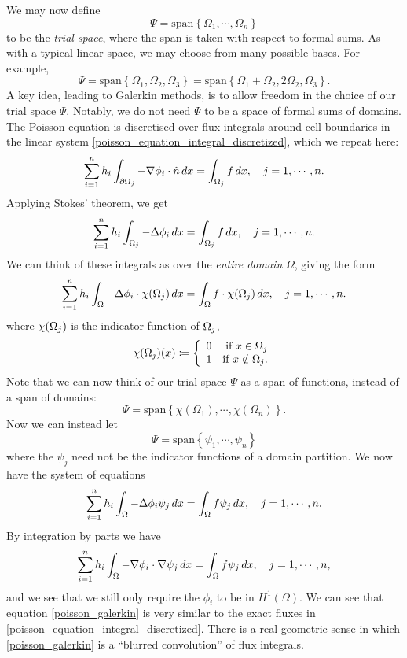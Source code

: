 We may now define
    $$\Psi = \text{span}\left\{\Omega_1,\cdots,\Omega_n\right\}$$
to be the \textit{trial space}, where the span is taken with respect to formal sums. As with a typical linear space,
we may choose from many possible bases. For example,
    $$\Psi = \text{span}\left\{\Omega_1, \Omega_2, \Omega_3\right\} =
    \text{span}\left\{\Omega_1 + \Omega_2, 2\Omega_2, \Omega_3\right\}.$$
A key idea, leading to Galerkin methods, is to allow freedom in the choice of our trial space $\Psi$.
Notably, we do not need $\Psi$ to be a space of formal sums of domains.
The Poisson equation is discretised over flux integrals around cell boundaries in the linear system \eqref{poisson_equation_integral_discretized},
which we repeat here:
\begin{align*}
    \sum_{i=1}^n h_i\int_{{\partial\Omega}_j} -\nabla \phi_i \cdot \hat{n}\,dx = \int_{{\Omega}_j} f\,dx,\quad j=1,\cdots,n.
\end{align*}
Applying Stokes' theorem, we get
\begin{align*}
    \sum_{i=1}^n h_i\int_{{\Omega}_j} -\Delta \phi_i \,dx = \int_{{\Omega}_j} f\,dx,\quad j=1,\cdots,n.
\end{align*}
We can think of these integrals as over the \textit{entire domain} $\Omega$, giving the form
\begin{align*}
    \sum_{i=1}^n h_i\int_{{\Omega}} -\Delta \phi_i\cdot \chi({\Omega}_j)\,dx = \int_{{\Omega}} f\cdot\chi({\Omega}_j)\,dx,\quad j=1,\cdots,n.
\end{align*}
where $\chi({\Omega}_j)$ is the indicator function of ${\Omega}_j$,
\begin{align*}
    \chi({\Omega}_j)(x) \coloneqq \left\{\begin{array}{lr}
        0 &\text{if $x \in {\Omega}_j$}\\
        1 &\text{if $x \notin {\Omega}_j$.}\\
        \end{array}\right.
\end{align*}
Note that we can now think of our trial space $\Psi$ as a span of functions, instead of a span of domains:
    $$\Psi = \text{span}\left\{\chi(\Omega_1),\cdots,\chi(\Omega_n)\right\}.$$
Now we can instead let
    $$\Psi = \text{span}\left\{\psi_1,\cdots,\psi_n\right\}$$
where the $\psi_j$
need not be the indicator functions of a domain partition. We now have the system of equations
\begin{align*}
    \sum_{i=1}^n h_i\int_{{\Omega}} -\Delta \phi_i \psi_j\,dx = \int_{{\Omega}} f\psi_j\,dx,\quad j=1,\cdots,n.
\end{align*}
By integration by parts we have
\begin{equation}\label{poisson_galerkin}
    \sum_{i=1}^n h_i\int_{{\Omega}} -\nabla \phi_i \cdot \nabla \psi_j\,dx = \int_{{\Omega}} f\psi_j\,dx,\quad j=1,\cdots,n,
\end{equation}
and we see that we still only require the $\phi_i$ to be in $H^1(\Omega)$.
We can see that equation \eqref{poisson_galerkin} is very similar to the exact fluxes in \eqref{poisson_equation_integral_discretized}.
There is a real geometric sense in which \eqref{poisson_galerkin} is a ``blurred convolution'' of flux integrals.

